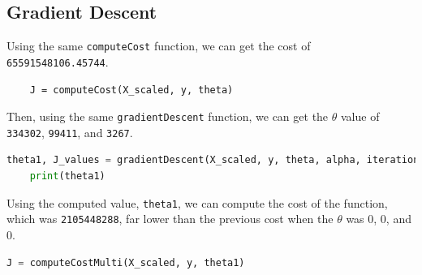 \documentclass[12pt]{article}
\begin{document}
\subsection{Gradient Descent}
Using the same \texttt{computeCost} function, we can get the cost of \texttt{65591548106.45744}.
\begin{lstlisting}
    J = computeCost(X_scaled, y, theta)
\end{lstlisting}

Then, using the same \texttt{gradientDescent} function, we can get the $\theta$ value of \texttt{334302}, \texttt{99411}, and \texttt{3267}.
\begin{lstlisting}[language=Python]
    theta1, J_values = gradientDescent(X_scaled, y, theta, alpha, iterations)
    print(theta1)
\end{lstlisting}

Using the computed value, \texttt{theta1}, we can compute the cost of the function, which was \texttt{2105448288}, far lower than the previous cost when the $\theta$ was 0, 0, and 0.

\begin{lstlisting}[language=Python]
  J = computeCostMulti(X_scaled, y, theta1)
\end{lstlisting}



\end{document}
